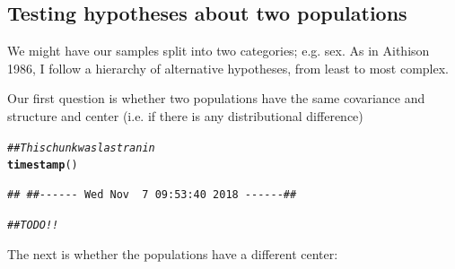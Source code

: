 \documentclass{article}\usepackage[]{graphicx}\usepackage[]{color}
\makeatletter
\newcommand{\hlcom}[1]{\textcolor[rgb]{0.678,0.584,0.686}{\textit{#1}}}%
\newcommand{\hlstd}[1]{\textcolor[rgb]{0.345,0.345,0.345}{#1}}%
\newcommand{\hlkwd}[1]{\textcolor[rgb]{0.737,0.353,0.396}{\textbf{#1}}}%
\newenvironment{kframe}{%
 \def\at@end@of@kframe{}%
 \ifinner\ifhmode%
  \def\at@end@of@kframe{\end{minipage}}%
  \begin{minipage}{\columnwidth}%
 \fi\fi%
 \def\FrameCommand##1{\hskip\@totalleftmargin \hskip-\fboxsep
 \colorbox{shadecolor}{##1}\hskip-\fboxsep
     \hskip-\linewidth \hskip-\@totalleftmargin \hskip\columnwidth}%
 \MakeFramed {\advance\hsize-\width
   \@totalleftmargin\z@ \linewidth\hsize
   \@setminipage}}%
 {\par\unskip\endMakeFramed%
 \at@end@of@kframe}
\newenvironment{knitrout}{}{} %
\makeatother
\begin{document}
\clearpage

\subsection{Testing hypotheses about two populations}
We might have our samples split into two categories; e.g. sex. As in Aithison 1986\cite{}, I follow a hierarchy of alternative hypotheses, from least to most complex.

Our first question is whether two populations have the same covariance and structure and center (i.e. if there is any distributional difference)

\begin{knitrout}
\color{fgcolor}\begin{kframe}
\begin{alltt}
\hlcom{## This chunk was last ran in}
\hlkwd{timestamp}\hlstd{()}
\end{alltt}
\begin{verbatim}
## ##------ Wed Nov  7 09:53:40 2018 ------##
\end{verbatim}
\begin{alltt}
\hlcom{##TODO!!}
\end{alltt}
\end{kframe}
\end{knitrout}

The next is whether the populations have a different center:
\end{document}
